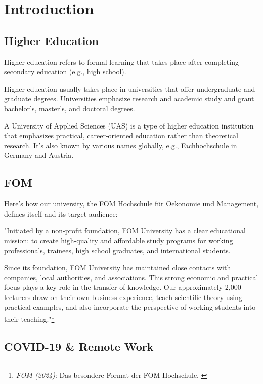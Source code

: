 %
%

\pagebreak
\section{Introduction}

\onehalfspacing

\subsection{Higher Education}

Higher education refers to formal learning that takes place after completing secondary education (e.g., high school).

Higher education usually takes place in universities that offer undergraduate and graduate degrees. Universities emphasize research and academic study and grant bachelor's, master's, and doctoral degrees.

A University of Applied Sciences (UAS) is a type of higher education institution that emphasizes practical, career-oriented education rather than theoretical research. It's also known by various names globally, e.g., Fachhochschule in Germany and Austria.

\subsection{FOM}

Here's how our university, the FOM Hochschule für Oekonomie und Management, defines itself and its target audience:

"Initiated by a non-profit foundation, FOM University has a clear educational mission: to create high-quality and affordable study programs for working professionals, trainees, high school graduates, and international students.

Since its foundation, FOM University has maintained close contacts with companies, local authorities, and associations. This strong economic and practical focus plays a key role in the transfer of knowledge. Our approximately 2,000 lecturers draw on their own business experience, teach scientific theory using practical examples, and also incorporate the perspective of working students into their teaching."\footnote{\textit{FOM (2024)}: Das besondere Format der FOM Hochschule. \cite{fomStift}}

\subsection{COVID-19 \& Remote Work}


